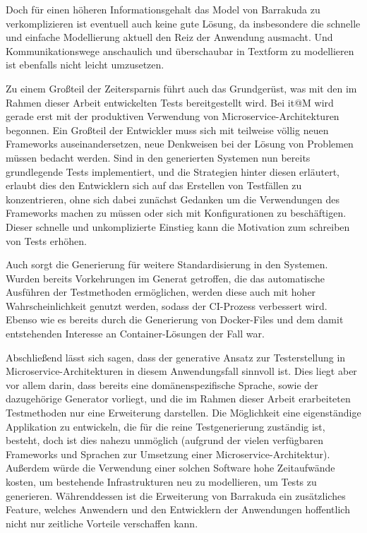 \documentclass[12pt,a4paper,bibliography=totocnumbered,listof=totocnumbered]{scrartcl}
\begin{document}
Doch für einen höheren Informationsgehalt das Model von Barrakuda zu verkomplizieren ist eventuell auch keine gute Lösung, da insbesondere die schnelle und einfache Modellierung aktuell den Reiz der Anwendung ausmacht. Und Kommunikationswege anschaulich und überschaubar in Textform zu modellieren ist ebenfalls nicht leicht umzusetzen.

Zu einem Großteil der Zeitersparnis führt auch das Grundgerüst, was mit den im Rahmen dieser Arbeit entwickelten Tests bereitgestellt wird. Bei it@M wird gerade erst mit der produktiven Verwendung von Microservice-Architekturen begonnen. Ein Großteil der Entwickler muss sich mit teilweise völlig neuen Frameworks auseinandersetzen, neue Denkweisen bei der Lösung von Problemen müssen bedacht werden. Sind in den generierten Systemen nun bereits grundlegende Tests implementiert, und die Strategien hinter diesen erläutert, erlaubt dies den Entwicklern sich auf das Erstellen von Testfällen zu konzentrieren, ohne sich dabei zunächst Gedanken um die Verwendungen des Frameworks machen zu müssen oder sich mit Konfigurationen zu beschäftigen. Dieser schnelle und unkomplizierte Einstieg kann die Motivation zum schreiben von Tests erhöhen.

Auch sorgt die Generierung für weitere Standardisierung in den Systemen. Wurden bereits Vorkehrungen im Generat getroffen, die das automatische Ausführen der Testmethoden ermöglichen, werden diese auch mit hoher Wahrscheinlichkeit genutzt werden, sodass der \acs{CI}-Prozess verbessert wird. Ebenso wie es bereits durch die Generierung von Docker-Files und dem damit entstehenden Interesse an Container-Lösungen der Fall war.

Abschließend lässt sich sagen, dass der generative Ansatz zur Testerstellung in Microservice-Architekturen in diesem Anwendungsfall sinnvoll ist. Dies liegt aber vor allem darin, dass bereits eine domänenspezifische Sprache, sowie der dazugehörige Generator vorliegt, und die im Rahmen dieser Arbeit erarbeiteten Testmethoden nur eine Erweiterung darstellen. Die Möglichkeit eine eigenständige Applikation zu entwickeln, die für die reine Testgenerierung zuständig ist, besteht, doch ist dies nahezu unmöglich (aufgrund der vielen verfügbaren Frameworks und Sprachen zur Umsetzung einer Microservice-Architektur). Außerdem würde die Verwendung einer solchen Software hohe Zeitaufwände kosten, um bestehende Infrastrukturen neu zu modellieren, um Tests zu generieren. Währenddessen ist die Erweiterung von Barrakuda ein zusätzliches Feature, welches Anwendern und den Entwicklern der Anwendungen hoffentlich nicht nur zeitliche Vorteile verschaffen kann.
\end{document}
